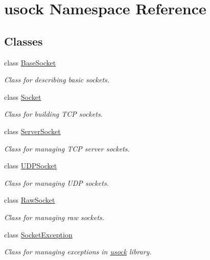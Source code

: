 \hypertarget{namespaceusock}{
\section{usock Namespace Reference}
\label{namespaceusock}
}
\subsection*{Classes}
\begin{CompactItemize}
\item 
class \hyperlink{classusock_1_1BaseSocket}{BaseSocket}
\begin{CompactList}\small\item\em Class for describing basic sockets. \item\end{CompactList}\item 
class \hyperlink{classusock_1_1Socket}{Socket}
\begin{CompactList}\small\item\em Class for building TCP sockets. \item\end{CompactList}\item 
class \hyperlink{classusock_1_1ServerSocket}{ServerSocket}
\begin{CompactList}\small\item\em Class for managing TCP server sockets. \item\end{CompactList}\item 
class \hyperlink{classusock_1_1UDPSocket}{UDPSocket}
\begin{CompactList}\small\item\em Class for managing UDP sockets. \item\end{CompactList}\item 
class \hyperlink{classusock_1_1RawSocket}{RawSocket}
\begin{CompactList}\small\item\em Class for managing raw sockets. \item\end{CompactList}\item 
class \hyperlink{classusock_1_1SocketException}{SocketException}
\begin{CompactList}\small\item\em Class for managing exceptions in \hyperlink{namespaceusock}{usock} library. \item\end{CompactList}\end{CompactItemize}
